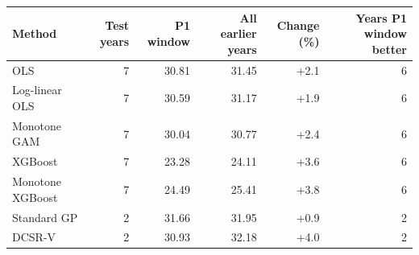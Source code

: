\begin{tabular}{lrrrrr}
\hline
Method & Test years & P1 window & All earlier years & Change (\%) & Years P1 window better \\
\hline
OLS & 7 & 30.81 & 31.45 & +2.1 & 6 \\
Log-linear OLS & 7 & 30.59 & 31.17 & +1.9 & 6 \\
Monotone GAM & 7 & 30.04 & 30.77 & +2.4 & 6 \\
XGBoost & 7 & 23.28 & 24.11 & +3.6 & 6 \\
Monotone XGBoost & 7 & 24.49 & 25.41 & +3.8 & 6 \\
Standard GP & 2 & 31.66 & 31.95 & +0.9 & 2 \\
DCSR-V & 2 & 30.93 & 32.18 & +4.0 & 2 \\
\hline
\end{tabular}
